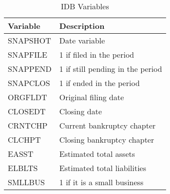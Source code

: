 \documentclass[12pt]{article}
\begin{document}
\begin{table}[h!]
    \centering
    \caption{IDB Variables}
    \label{tab:IDB}
    \begin{tabular}{ll}
    \toprule
    Variable & Description \\ 
    \midrule
    SNAPSHOT & Date variable \\ 
    SNAPFILE & 1 if filed in the period \\ 
    SNAPPEND & 1 if still pending in the period \\ 
    SNAPCLOS & 1 if ended in the period \\ 
    ORGFLDT & Original filing date \\ 
    CLOSEDT & Closing date \\ 
    CRNTCHP & Current bankruptcy chapter \\ 
    CLCHPT & Closing bankruptcy chapter \\ 
    EASST & Estimated total assets \\ 
    ELBLTS & Estimated total liabilities \\ 
    SMLLBUS & 1 if it is a small business \\ 
    \bottomrule
  \end{tabular}
\end{table}
    
\end{document}
